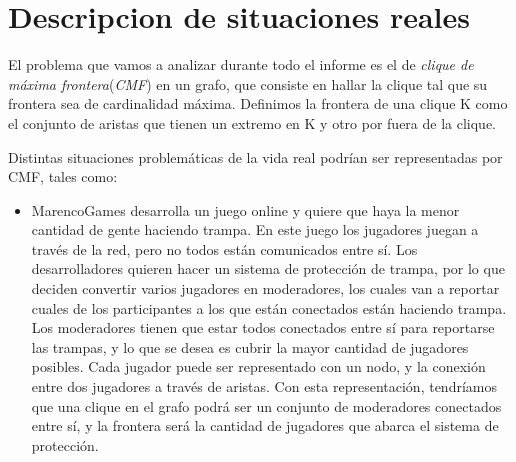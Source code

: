 \section{Descripcion de situaciones reales}
El problema que vamos a analizar durante todo el informe es el de \textit{clique de máxima frontera}(\textit{CMF}) en un grafo, que consiste en hallar la clique tal que su frontera sea de cardinalidad máxima. Definimos la frontera de una clique K como el conjunto de aristas que tienen un extremo en K y otro por fuera de la clique.

Distintas situaciones problemáticas de la vida real podrían ser representadas por CMF, tales como:

\begin{itemize}

\item MarencoGames desarrolla un juego online y quiere que haya la menor cantidad de gente haciendo trampa. En este juego los jugadores juegan a través de la red, pero no todos están comunicados entre sí. Los desarrolladores quieren hacer un sistema de protección de trampa, por lo que deciden convertir varios jugadores en moderadores, los cuales van a reportar cuales de los participantes a los que están conectados están haciendo trampa. Los moderadores tienen que estar todos conectados entre sí para reportarse las trampas, y lo que se desea es cubrir la mayor cantidad de jugadores posibles.  Cada jugador puede ser representado con un nodo, y la conexión entre dos jugadores a través de aristas. Con esta representación, tendríamos que una clique en el grafo podrá ser un conjunto de moderadores conectados entre sí, y la frontera será la cantidad de jugadores que abarca el sistema de protección.


\end{itemize}


